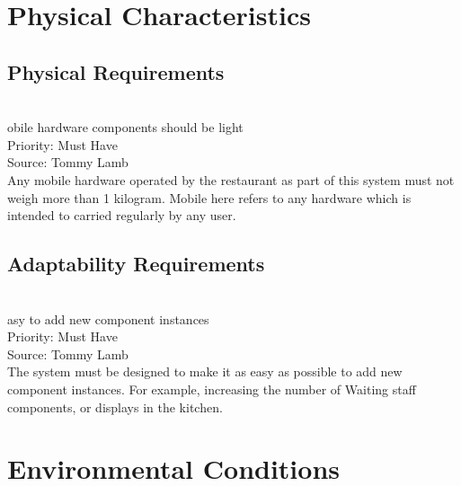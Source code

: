 \documentclass[11pt, a4paper]{report}
\def\itempar#1\\{\item \textbf{#1}\\} %
\begin{document}
\section{Physical Characteristics}

\subsection{Physical Requirements}

\begin{enumerate}[resume*=nonfunctional]
\itempar Mobile hardware components should be light\\
Priority: Must Have\\
Source: Tommy Lamb\\
Any mobile hardware operated by the restaurant as part of this system must not weigh more than 1 kilogram. Mobile here refers to any hardware which is intended to carried regularly by any user.
\end{enumerate}

\subsection{Adaptability Requirements}

\begin{enumerate}[resume*=nonfunctional]
\itempar Easy to add new component instances\\
Priority: Must Have\\
Source: Tommy Lamb\\
The system must be designed to make it as easy as possible to add new component instances. For example, increasing the number of Waiting staff components, or displays in the kitchen.
\end{enumerate}

\section{Environmental Conditions}
\end{document}
